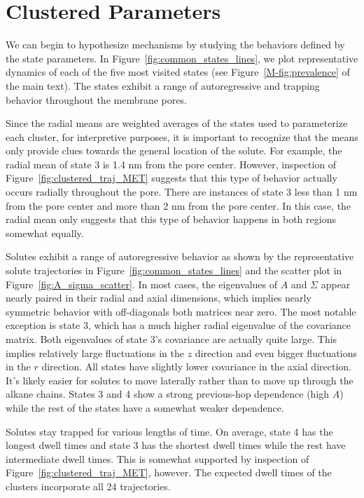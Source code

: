 \documentclass{article}
\begin{document}
  \section{Clustered Parameters}\label{section:clustered_parmeters}
  
  We can begin to hypothesize mechanisms by studying the behaviors defined by the 
  state parameters. In Figure~\ref{fig:common_states_lines}, we plot representative 
  dynamics of each of the five most visited states (see Figure~\ref{M-fig:prevalence}
  of the main text). The states exhibit a range of autoregressive and trapping 
  behavior throughout the membrane pores.
  
  Since the radial means are weighted averages of the states used to parameterize
  each cluster, for interpretive purposes, it is important to recognize that the means
  only provide clues towards the general location of the solute. For example, the 
  radial mean of state 3 is 1.4 nm from the pore center. However, inspection of 
  Figure~\ref{fig:clustered_traj_MET} suggests that this type of behavior actually
  occurs radially throughout the pore. There are instances of state 3 less than 1 nm
  from the pore center and more than 2 nm from the pore center. In this case, the 
  radial mean only suggests that this type of behavior happens in both regions somewhat
  equally.
  
  Solutes exhibit a range of autoregressive behavior as shown by the representative 
  solute trajectories in Figure~\ref{fig:common_states_lines} and the scatter
  plot in Figure~\ref{fig:A_sigma_scatter}. In most cases, the eigenvalues of $A$ and
  $\Sigma$ appear nearly paired in their radial and axial dimensions, which implies 
  nearly symmetric behavior with off-diagonals both matrices near zero. The most 
  notable exception is state 3, which has a much higher radial eigenvalue of the 
  covariance matrix. Both eigenvalues of state 3's covariance are actually quite
  large. This implies relatively large fluctuations in the $z$ direction and even
  bigger fluctuations in the $r$ direction. All states have slightly lower covariance
  in the axial direction. It's likely easier for solutes to move laterally rather 
  than to move up through the alkane chains. States 3 and 4 show a strong previous-hop
  dependence (high $A$) while the rest of the states have a somewhat weaker dependence.

  Solutes stay trapped for various lengths of time. On average, state 4 has the longest 
  dwell times and state 3 has the shortest dwell times while the rest have intermediate
  dwell times. This is somewhat supported by inspection of Figure~\ref{fig:clustered_traj_MET},
  however. The expected dwell times of the clusters incorporate all 24 trajectories.
  
\end{document}
